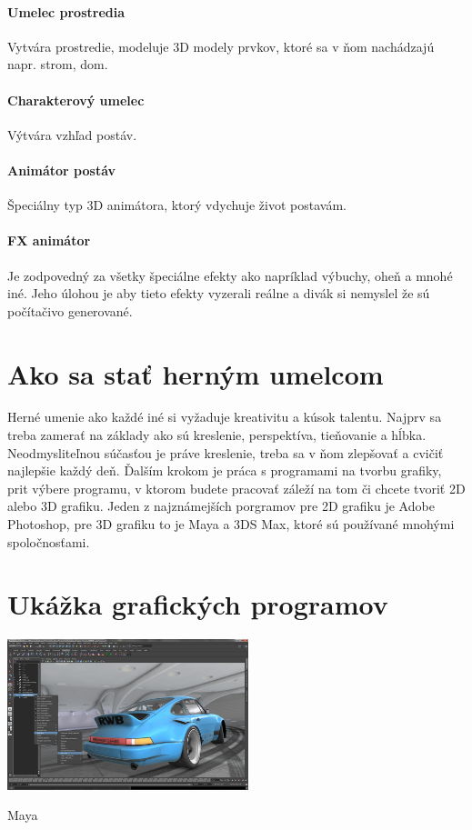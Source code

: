 \documentclass[10pt,twoside,slovak,a4paper]{article}
\begin{document}
\paragraph{Umelec prostredia} Vytvára prostredie, modeluje 3D modely prvkov, ktoré sa v ňom nachádzajú napr. strom, dom.

\paragraph{Charakterový umelec} Výtvára vzhľad postáv.
\paragraph{Animátor postáv} Špeciálny typ 3D animátora, ktorý vdychuje život postavám.
\paragraph{FX animátor}Je zodpovedný za všetky špeciálne efekty ako napríklad výbuchy, oheň a mnohé iné. Jeho úlohou je aby tieto efekty vyzerali reálne a divák si nemyslel že sú počítačivo generované.

\section{Ako sa stať herným umelcom}
Herné umenie ako každé iné si vyžaduje kreativitu a kúsok talentu. Najprv sa treba zamerať na základy ako sú kreslenie, perspektíva, tieňovanie a hĺbka. Neodmysliteľnou súčasťou je práve kreslenie, treba sa v ňom zlepšovať a cvičiť najlepšie každý deň. Ďalším krokom je práca s programami na tvorbu grafiky, prit výbere programu, v ktorom budete pracovať záleží na tom či chcete tvoriť 2D alebo 3D grafiku. Jeden z najznámejších porgramov pre 2D grafiku je Adobe Photoshop, pre 3D grafiku to je Maya a 3DS Max, ktoré sú používané mnohými spoločnosťami.
\section{Ukážka grafických programov}

\includegraphics[width=7cm]{maya.jpg}
\caption{Maya}
\end{document}

